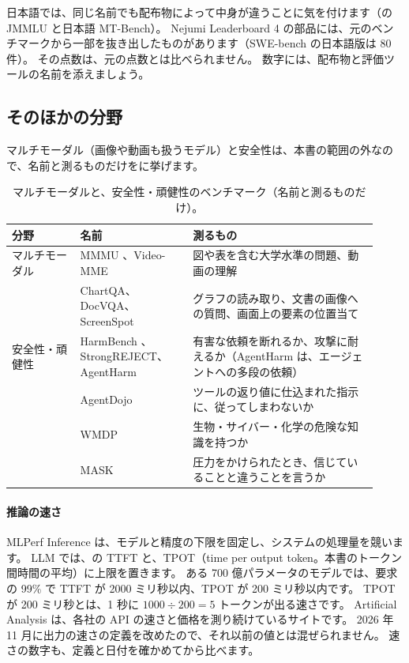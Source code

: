 日本語では、同じ名前でも配布物によって中身が違うことに気を付けます（の JMMLU と日本語 MT-Bench）。
Nejumi Leaderboard 4 の部品には、元のベンチマークから一部を抜き出したものがあります（SWE-bench の日本語版は 80 件）。
その点数は、元の点数とは比べられません。
数字には、配布物と評価ツールの名前を添えましょう。

\subsection{そのほかの分野}\label{sec:bm-others}

マルチモーダル（画像や動画も扱うモデル）と安全性は、本書の範囲の外なので、名前と測るものだけをに挙げます。

\begin{table}[htbp]
\centering\small\setlength{\tabcolsep}{4pt}
\caption{マルチモーダルと、安全性・頑健性のベンチマーク（名前と測るものだけ）。}
\label{tab:bm-others}
\begin{tabular}{@{}>{\raggedright\arraybackslash}p{0.17\linewidth}>{\raggedright\arraybackslash}p{0.29\linewidth}>{\raggedright\arraybackslash}p{0.46\linewidth}@{}}
\toprule
分野 & 名前 & 測るもの \\
\midrule
マルチモーダル & MMMU \cite{yue2023mmmu}、Video-MME & 図や表を含む大学水準の問題、動画の理解 \\
 & ChartQA、DocVQA、ScreenSpot & グラフの読み取り、文書の画像への質問、画面上の要素の位置当て \\
\addlinespace[0.2em]
安全性・頑健性 & HarmBench \cite{mazeika2024harmbench}、StrongREJECT、AgentHarm & 有害な依頼を断れるか、攻撃に耐えるか（AgentHarm は、エージェントへの多段の依頼） \\
 & AgentDojo \cite{debenedetti2024agentdojo} & ツールの返り値に仕込まれた指示に、従ってしまわないか \\
 & WMDP \cite{li2024wmdp} & 生物・サイバー・化学の危険な知識を持つか \\
 & MASK & 圧力をかけられたとき、信じていることと違うことを言うか \\
\bottomrule
\end{tabular}
\end{table}

\paragraph{推論の速さ}
MLPerf Inference \cite{reddi2019mlperf} は、モデルと精度の下限を固定し、システムの処理量を競います。
LLM では、の TTFT と、TPOT（time per output token。本書のトークン間時間の平均）に上限を置きます。
ある 700 億パラメータのモデルでは、要求の 99\% で TTFT が 2000 ミリ秒以内、TPOT が 200 ミリ秒以内です。
TPOT が 200 ミリ秒とは、1 秒に $1000\div200=5$ トークンが出る速さです。
Artificial Analysis は、各社の API の速さと価格を測り続けているサイトです。
2026 年 11 月に出力の速さの定義を改めたので、それ以前の値とは混ぜられません。
速さの数字も、定義と日付を確かめてから比べます。

